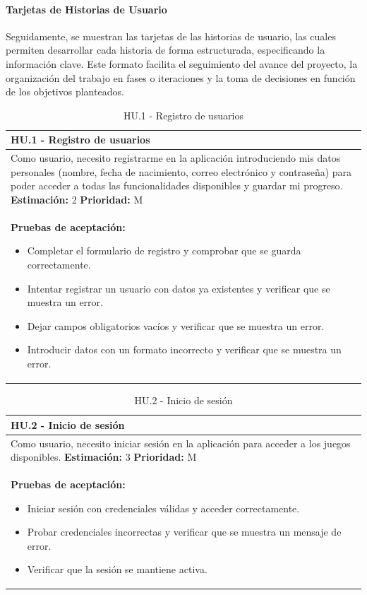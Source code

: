 \newpage

\paragraph{Tarjetas de Historias de Usuario}
Seguidamente, se muestran las tarjetas de las historias de usuario, las cuales permiten desarrollar cada historia de forma estructurada, especificando la información clave. 
Este formato facilita el seguimiento del avance del proyecto, la organización del trabajo en fases o iteraciones y la toma de decisiones en función de los objetivos planteados.

\begin{table}[H]
\centering
\begin{tabularx}{\textwidth}{|X|}
\hline
\textbf{HU.1 - Registro de usuarios}  \\
\hline
Como usuario, necesito registrarme en la aplicación introduciendo mis datos personales (nombre, fecha de nacimiento, correo electrónico y contraseña) para poder acceder a todas las funcionalidades disponibles y guardar mi progreso. 
\clearpage
\textbf{Estimación: }2
\clearpage
\textbf{Prioridad: }M
\\
\hline
\textbf{Pruebas de aceptación:}
\begin{itemize}
    \item Completar el formulario de registro y comprobar que se guarda correctamente.
    \item Intentar registrar un usuario con datos ya existentes y verificar que se muestra un error.
    \item Dejar campos obligatorios vacíos y verificar que se muestra un error.
    \item Introducir datos con un formato incorrecto y verificar que se muestra un error.
\end{itemize}
 \\
\hline
\end{tabularx}
\caption{HU.1 - Registro de usuarios}
\end{table}

\begin{table}[H]
\centering
\begin{tabularx}{\textwidth}{|X|}
\hline
\textbf{HU.2 - Inicio de sesión}  \\
\hline
Como usuario, necesito iniciar sesión en la aplicación para acceder a los juegos disponibles.
\clearpage
\textbf{Estimación: }3
\clearpage
\textbf{Prioridad: }M
\\
\hline
\textbf{Pruebas de aceptación:}
\begin{itemize}
    \item Iniciar sesión con credenciales válidas y acceder correctamente.
    \item Probar credenciales incorrectas y verificar que se muestra un mensaje de error.
    \item Verificar que la sesión se mantiene activa.
\end{itemize}
 \\
\hline
\end{tabularx}
\caption{HU.2 - Inicio de sesión}
\end{table}

